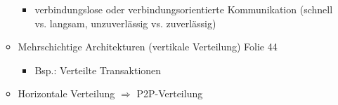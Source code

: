 \begin{itemize}
\begin{itemize}
				\begin{itemize}
					\item verbindungslose oder verbindungsorientierte Kommunikation (schnell vs. langsam, unzuverlässig vs. zuverlässig)
				\end{itemize}
			\item Mehrschichtige Architekturen (vertikale Verteilung) Folie 44
				\begin{itemize}
					\item Bsp.: Verteilte Transaktionen
				\end{itemize}
			\item Horizontale Verteilung $\Rightarrow$ P2P-Verteilung
		\end{itemize}
\end{itemize}
